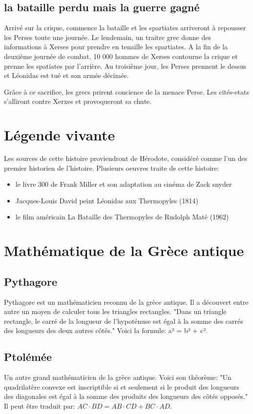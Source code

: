 \documentclass[10pt,a4paper]{article}
\begin{document}
  \subsection{la bataille perdu mais la guerre gagné}
  Arrivé sur la crique, commence la bataille et les spartiates arriveront à repousser les Perses toute une journée. Le lendemain, un traitre grec donne des informations à Xerses pour prendre en tenaille les spartiates. A la fin de la deuxième journée de combat, 10 000 hommes de Xerses contourne la crique et prenne les spatiates par l'arrière. Au troisième jour, les Perses prennent le dessus et Léonidas est tué et son armée décimée.
  
  Grâce à ce sacrifice, les grecs prirent concience de la menace Perse. Les cités-etats s'alliront contre Xerxes et provoqueront sa chute.

\section{Légende vivante}
    Les sources de cette histoire proviendront de Hérodote, considéré comme l'un des premier historien de l'histoire.
    Plusieurs oeuvres traite de cette histoire:
    \begin{itemize}
        \item le livre 300 de Frank Miller et son adaptation au cinéma de Zack snyder
        \item Jacques-Louis David peint Léonidas aux Thermopyles (1814)
        \item le film américain  La Bataille des Thermopyles de Rudolph Maté (1962)
    \end{itemize}
    
\section{Mathématique de la Grèce antique}
\subsection{Pythagore}
Pythagore est un mathématicien reconnu de la grèce antique. Il a découvert entre autre un moyen de calculer tous les triangles rectangles.
"Dans un triangle rectangle, le carré de la longueur de l’hypoténuse est égal à la somme des carrés des longueurs des deux autres côtés." Voici la formule: a² = b² + c².
\subsection{Ptolémée}
Un autre grand mathématicien de la grèce antique. Voici son théorème: "Un quadrilatère convexe est inscriptible si et seulement si le produit des longueurs des diagonales est égal à la somme des produits des longueurs des côtés opposés." Il peut être traduit par: ${\displaystyle AC\cdot BD=AB\cdot CD+BC\cdot AD.}$
\end{document}
